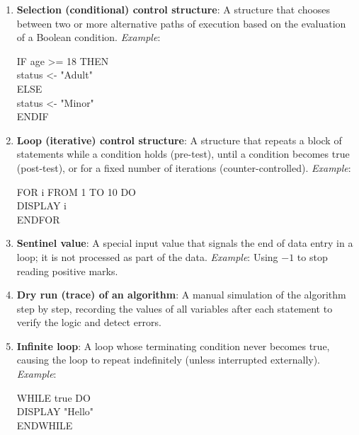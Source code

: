 \documentclass[11pt]{article}
\begin{document}
\begin{corrige}
\begin{enumerate}
\item \textbf{Selection (conditional) control structure}: A structure that chooses between two or more alternative paths of execution based on the evaluation of a Boolean condition.  
\textit{Example}: 
\begin{flushleft}\ttfamily\small
IF age >= 18 THEN\\
\quad status <- "Adult"\\
ELSE\\
\quad status <- "Minor"\\
ENDIF
\end{flushleft}

\item \textbf{Loop (iterative) control structure}: A structure that repeats a block of statements while a condition holds (pre-test), until a condition becomes true (post-test), or for a fixed number of iterations (counter-controlled).  
\textit{Example}:
\begin{flushleft}\ttfamily\small
FOR i FROM 1 TO 10 DO\\
\quad DISPLAY i\\
ENDFOR
\end{flushleft}

\item \textbf{Sentinel value}: A special input value that signals the end of data entry in a loop; it is not processed as part of the data.  
\textit{Example}: Using $-1$ to stop reading positive marks.

\item \textbf{Dry run (trace) of an algorithm}: A manual simulation of the algorithm step by step, recording the values of all variables after each statement to verify the logic and detect errors.

\item \textbf{Infinite loop}: A loop whose terminating condition never becomes true, causing the loop to repeat indefinitely (unless interrupted externally).  
\textit{Example}:
\begin{flushleft}\ttfamily\small
WHILE true DO\\
\quad DISPLAY "Hello"\\
ENDWHILE
\end{flushleft}
\end{enumerate}
\end{corrige}
\end{document}
